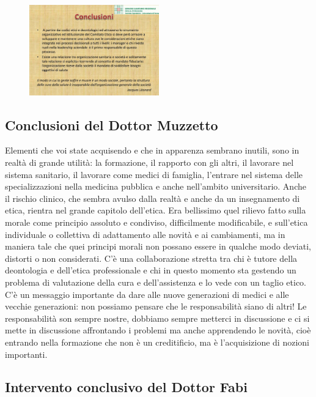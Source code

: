  \begin{figure}[!ht]
\centering
	\includegraphics[width=0.5\textwidth]{32/image27.jpeg}
	\end{figure}

\subsection{Conclusioni del Dottor Muzzetto}

Elementi che voi state acquisendo e che in apparenza sembrano inutili,
sono in realtà di grande utilità: la formazione, il rapporto con gli
altri, il lavorare nel sistema sanitario, il lavorare come medici di
famiglia, l'entrare nel sistema delle specializzazioni nella medicina
pubblica e anche nell'ambito universitario. Anche il rischio clinico,
che sembra avulso dalla realtà e anche da un insegnamento di etica,
rientra nel grande capitolo dell'etica. Era bellissimo quel rilievo
fatto sulla morale come principio assoluto e condiviso, difficilmente
modificabile, e sull'etica individuale o collettiva di adattamento alle
novità e ai cambiamenti, ma in maniera tale che quei principi morali non
possano essere in qualche modo deviati, distorti o non considerati. C'è
una collaborazione stretta tra chi è tutore della deontologia e
dell'etica professionale e chi in questo momento sta gestendo un
problema di valutazione della cura e dell'assistenza e lo vede con un
taglio etico. C'è un messaggio importante da dare alle nuove generazioni
di medici e alle vecchie generazioni: non possiamo pensare che le
responsabilità siano di altri! Le responsabilità son sempre nostre,
dobbiamo sempre metterci in discussione e ci si mette in discussione
affrontando i problemi ma anche apprendendo le novità, cioè entrando
nella formazione che non è un creditificio, ma è l'acquisizione di
nozioni importanti.

\subsection{Intervento conclusivo del Dottor Fabi}

